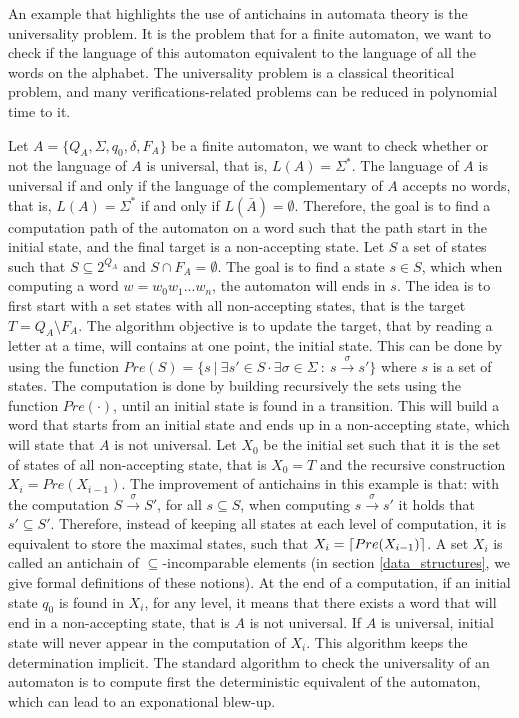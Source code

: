\documentclass[letterpaper]{article}
\DeclarePairedDelimiter{\ceil}{\lceil}{\rceil}
\theoremstyle{definition}
\begin{document}
An example that highlights the use of antichains in automata theory is
the universality problem.
It is the problem that for a finite automaton, we want to
check if the language of this automaton equivalent to the language
of all the words on the alphabet. The universality problem is a classical
theoritical problem, and many verifications-related problems can be
reduced in polynomial time to it.

Let $A = \{Q_A, \Sigma, q_0, \delta, F_A\}$ be a finite automaton,
we want to check whether or not
the language of $A$ is universal, that is, $L(A) = \Sigma^*$.
The language of $A$ is universal if and only if the language
of the complementary of $A$ accepts no words, that is,
$L(A) = \Sigma^*$ if and only if $L(\bar{A}) = \emptyset$.
Therefore, the goal is to find a computation path of the
automaton on a word such that the path start in the initial state,
and the final target is a non-accepting state.
Let $S$ a set of states such that $S \subseteq 2^{Q_A}$ and
$S \cap F_A = \emptyset$. The goal is to find a state $s \in S$,
which when computing a word $w = w_0w_1...w_n$, the automaton will ends
in $s$. The idea is to first start with a set states with all non-accepting
states, that is the target $T = Q_A \setminus F_A$. The algorithm
objective is to update the target, that by reading a letter at a time,
will contains at one point, the initial state.
This can be done by using the function
$Pre(S) = \{s \ | \ \exists s' \in S \cdot \exists \sigma \in \Sigma \ :
\ s \xrightarrow{\sigma} s'\}$ where $s$ is a set of states.
The computation is done by building recursively
the sets using the function $Pre(\cdot)$, until an initial state
is found in a transition. This will build a word that starts
from an initial state and ends up in a non-accepting state,
which will state that $A$ is not universal.
 Let $X_0$ be the initial set such that
it is the set of states of all non-accepting state, that is $X_0 = T$
and the recursive construction $X_i = Pre(X_{i-1})$. The improvement
of antichains in this example is that: with
the computation $S \xrightarrow{\sigma}
S'$, for all $s \subseteq S$, when computing $s \xrightarrow{\sigma} s'$
it holds that $s' \subseteq S'$. Therefore, instead of keeping all states
at each level of computation, it is equivalent to store the maximal
states, such that $X_i = \ceil{Pre(X_{i-1})}$. A set
$X_i$ is called an antichain
of $\subseteq$-incomparable elements
(in section \ref{data_structures},
we give formal definitions of these notions). At the end of a computation,
if an initial state $q_0$ is found in $X_i$, for any level,
it means that there exists a word that will end in a non-accepting state,
that is $A$ is not universal. If $A$ is universal, initial state will never
appear in the computation of $X_i$.
This algorithm keeps the determination implicit.
The standard algorithm to check the universality of an automaton
is to compute first the deterministic equivalent of the automaton, which
can lead to an exponational blew-up.
\end{document}
